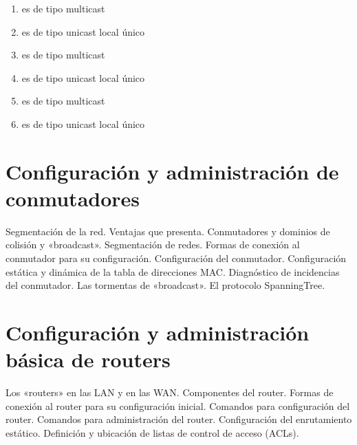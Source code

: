 \documentclass[letterpaper,10pt,spanish]{sphinxmanual}
\begin{document}
\begin{enumerate}
\item {} 
 es de tipo multicast

\item {} 
 es de tipo unicast local único

\item {} 
 es de tipo multicast

\item {} 
 es de tipo unicast local único

\item {} 
 es de tipo multicast

\item {} 
 es de tipo unicast local único

\end{enumerate}


\chapter{Configuración y administración de conmutadores}
\label{\detokenize{t3_conmutadores/apuntes_t3:configuracion-y-administracion-de-conmutadores}}\label{\detokenize{t3_conmutadores/apuntes_t3::doc}}
Segmentación de la red.
Ventajas que presenta.
Conmutadores y dominios de colisión y  «broadcast».
Segmentación de redes.
Formas de conexión al conmutador para su configuración.
Configuración del conmutador.
Configuración estática y dinámica de la tabla de direcciones MAC.
Diagnóstico de incidencias del conmutador.
Las tormentas de «broadcast».
El protocolo Spanning\sphinxhyphen{}Tree.


\chapter{Configuración y administración básica de routers}
\label{\detokenize{t4_routers/apuntes_t4:configuracion-y-administracion-basica-de-routers}}\label{\detokenize{t4_routers/apuntes_t4::doc}}
Los «routers» en las LAN y en las WAN.
Componentes del router.
Formas de conexión al router para su configuración inicial.
Comandos para configuración del router.
Comandos para administración del router.
Configuración del enrutamiento estático.
Definición y ubicación de listas de control de acceso (ACLs).
\end{document}
